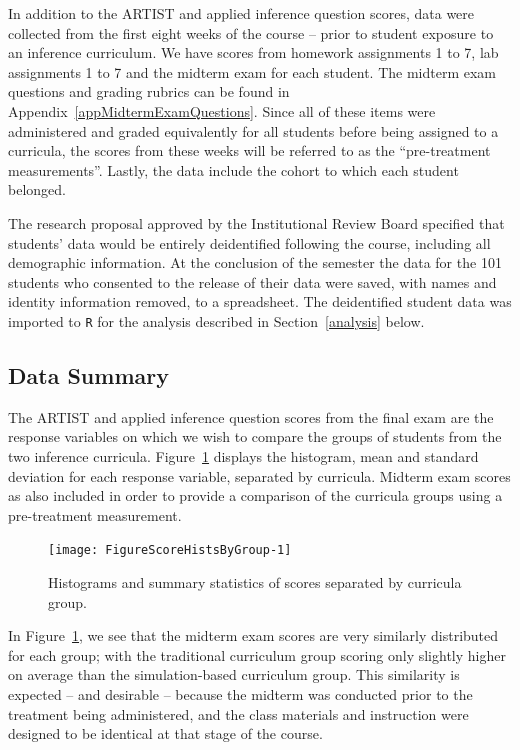 \documentclass[11pt]{isuthesis}\usepackage[]{graphicx}\usepackage[]{color}
\newenvironment{knitrout}{}{} %
\begin{document}
In addition to the ARTIST and applied inference question scores, data were collected from the first eight weeks of the course -- prior to student exposure to an inference curriculum. We have scores from homework assignments 1 to 7, lab assignments 1 to 7 and the midterm exam for each student. The midterm exam questions and grading rubrics can be found in Appendix~\ref{appMidtermExamQuestions}. Since all of these items were administered and graded equivalently for all students before being assigned to a curricula, the scores from these weeks will be referred to as the ``pre-treatment measurements''. Lastly, the data include the cohort to which each student belonged.

The research proposal approved by the Institutional Review Board specified that students' data would be entirely deidentified following the course, including all demographic information.  At the conclusion of the semester the data for the 101 students who consented to the release of their data were saved, with names and identity information removed, to a spreadsheet.  The deidentified student data was imported to \texttt{R} for the analysis described in Section~\ref{analysis} below. 


\subsection{Data Summary}
\label{dataSummary}

The ARTIST and applied inference question scores from the final exam are the response variables on which we wish to compare the groups of students from the two inference curricula. Figure~\ref{fig:ScoreHistsByGroup} displays the histogram, mean and standard deviation for each response variable, separated by curricula.  Midterm exam scores as also included in order to provide a comparison of the curricula groups using a pre-treatment measurement. 

\begin{knitrout}
\color{fgcolor}\begin{figure}[H]

{\centering \texttt{[image: FigureScoreHistsByGroup-1]} 

}

\caption[Histograms and summary statistics of scores separated by curricula group]{Histograms and summary statistics of scores separated by curricula group.}\label{fig:ScoreHistsByGroup}
\end{figure}


\end{knitrout}
\vspace{.05in}
In Figure~\ref{fig:ScoreHistsByGroup}, we see that the midterm exam scores are very similarly distributed for each group; with the traditional curriculum group scoring only slightly higher on average than the simulation-based curriculum group. This similarity is expected -- and desirable -- because the midterm was conducted prior to the treatment being administered, and the class materials and instruction were designed to be identical at that stage of the course.
\end{document}
